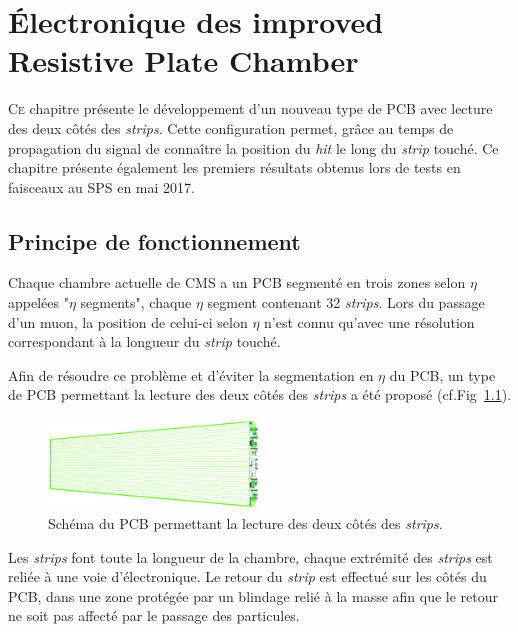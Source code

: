 \chapter{Électronique des improved Resistive Plate Chamber}
\label{time}
\renewcommand\chapterillustration{ELE/ele}
\ThisULCornerWallPaper{1}{\chapterillustration}
\minitoc

\lettrine[lines=4, slope=-0.5em]{C}{e} chapitre présente le développement d'un nouveau type de PCB avec lecture des deux côtés des \textit{strips}. Cette configuration permet, grâce au temps de propagation du signal de connaître la position du \textit{hit} le long du \textit{strip} touché. Ce chapitre présente également les premiers résultats obtenus lors de tests en faisceaux au SPS en mai 2017.
\vspace{-0.3cm}
\section{Principe de fonctionnement}
\vspace{-0.5cm}
Chaque chambre actuelle de CMS a un PCB segmenté en trois zones selon $\eta$ appelées "$\eta$ segments", chaque $\eta$ segment contenant \num{32} \textit{strips}. Lors du passage d'un muon, la position de celui-ci selon $\eta$ n'est connu qu'avec une résolution correspondant à la longueur du \textit{strip} touché.

Afin de résoudre ce problème et d'éviter la segmentation en $\eta$ du PCB, un type de PCB permettant la lecture des deux côtés des \textit{strips} a été proposé (cf.Fig~\ref{PCB1}).
\vspace*{-0.3cm}
\begin{figure}[ht!]
	\centering
	\includegraphics[width=0.50\textwidth]{ELE/PCB1.png}
	\captionsetup{type=figure}\caption{Schéma du PCB permettant la lecture des deux côtés des \textit{strips}.}
	\label{PCB1}
\end{figure}

\vspace{-0.5cm}
Les \textit{strips} font toute la longueur de la chambre, chaque extrémité des \textit{strips} est reliée à une voie d'électronique. Le retour du \textit{strip} est effectué sur les côtés du PCB, dans une zone protégée par un blindage relié à la masse afin que le retour ne soit pas affecté par le passage des particules.

